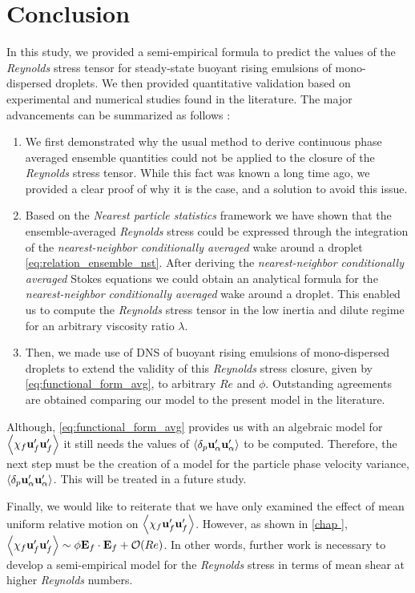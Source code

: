 \section{Conclusion}

In this study, we provided a semi-empirical formula to predict the values of the \textit{Reynolds} stress tensor for steady-state buoyant rising emulsions of mono-dispersed droplets. 
We then provided quantitative validation based on experimental and numerical studies found in the literature. 
The major advancements can be summarized as follows : 
\begin{enumerate}
    \item We first demonstrated why the usual method to derive continuous phase averaged ensemble quantities could not be applied to the closure of the \textit{Reynolds} stress tensor. 
    While this fact was known a long time ago, we provided a clear proof of why it is the case, and a solution to avoid this issue. 
    \item Based on the \textit{Nearest particle statistics} framework we have shown that the ensemble-averaged \textit{Reynolds} stress could be expressed through the integration of the \textit{nearest-neighbor conditionally averaged} wake around a droplet \eqref{eq:relation_ensemble_nst}. 
    After deriving the \textit{nearest-neighbor conditionally averaged} Stokes equations we could obtain an analytical formula for the \textit{nearest-neighbor conditionally averaged} wake around a droplet.
    This enabled us to compute the \textit{Reynolds} stress tensor in the low inertia and dilute regime for an arbitrary viscosity ratio $\lambda$. 
    \item  Then, we made use of DNS of buoyant rising emulsions of mono-dispersed droplets to extend the validity of this \textit{Reynolds} stress closure, given by \ref{eq:functional_form_avg}, to arbitrary $Re$ and $\phi$. 
    Outstanding agreements are obtained comparing our model to the present model in the literature.  
\end{enumerate}
Although, \ref{eq:functional_form_avg} provides us with an algebraic model for $\left<\chi_f \textbf{u}_f'\textbf{u}_f'\right>$ it still needs the values of $\left<\delta_p \textbf{u}_\alpha' \textbf{u}_\alpha'\right>$ to be computed. 
Therefore, the next step must be the creation of a model for the particle phase velocity variance, $\left<\delta_p \textbf{u}_\alpha' \textbf{u}_\alpha'\right>$. 
This will be treated in a future study. 

Finally, we would like to reiterate that we have only examined the effect of mean uniform relative motion on $\left<\chi_f \textbf{u}_f'\textbf{u}_f'\right>$. However, as shown in \ref{chap
}, $\left<\chi_f \textbf{u}_f'\textbf{u}_f'\right>\sim \phi \textbf{E}_f \cdot \textbf{E}_f+\mathcal{O}(Re)$.
In other words, further work is necessary to develop a semi-empirical model for the \textit{Reynolds} stress in terms of mean shear at higher \textit{Reynolds} numbers.

